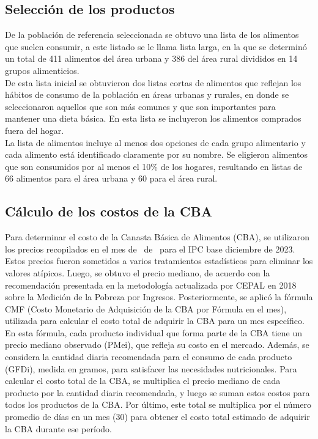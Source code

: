 \documentclass[letterpaper, 12pt, twoside]{article}
\begin{document}
\newpage

\subsection{Selección de los productos}

De la población de referencia seleccionada se obtuvo una lista de los alimentos
que suelen consumir, a este listado se le llama lista larga, en la que se
determinó un total de 411 alimentos del área urbana y 386 del área rural
divididos en 14 grupos alimenticios.
\\[\baselineskip]
De esta lista inicial se obtuvieron dos listas cortas de alimentos que reflejan
los hábitos de consumo de la población en áreas urbanas y rurales, en donde se
seleccionaron aquellos que son más comunes y que son importantes para mantener
una dieta básica.
En esta lista se incluyeron los alimentos comprados fuera del hogar.
\\[\baselineskip]
La lista de alimentos incluye al menos dos opciones de cada grupo alimentario y
cada alimento está identificado claramente por su nombre. Se eligieron alimentos
que son consumidos por al menos el 10\% de los hogares, resultando en listas de
66 alimentos para el área urbana y 60 para el área rural.

\subsection{Cálculo de los costos de la CBA}

Para determinar el costo de la Canasta Básica de Alimentos (CBA), se utilizaron
los precios recopilados en el mes de \mes\ de \anio\ para el IPC base
diciembre de 2023.
Estos precios fueron sometidos a varios tratamientos estadísticos para eliminar
los valores atípicos.
Luego, se obtuvo el precio mediano, de acuerdo con la recomendación presentada
en la metodología actualizada por CEPAL en 2018 sobre la Medición de la Pobreza
por Ingresos.
Posteriormente, se aplicó la fórmula CMF (Costo Monetario de Adquisición de la
CBA por Fórmula en el mes), utilizada para calcular el costo total de adquirir
la CBA para un mes específico.
\\[\baselineskip]
En esta fórmula, cada producto individual que forma parte de la CBA tiene un
precio mediano observado (PMei), que refleja su costo en el mercado. Además, se
considera la cantidad diaria recomendada para el consumo de cada producto
(GFDi), medida en gramos, para satisfacer las necesidades nutricionales.
Para calcular el costo total de la CBA, se multiplica el precio mediano de cada
producto por la cantidad diaria recomendada, y luego se suman estos costos para
todos los productos de la CBA.
Por último, este total se multiplica por el número promedio de días en un mes
(30) para obtener el costo total estimado de adquirir la CBA durante ese
período.
\end{document}
